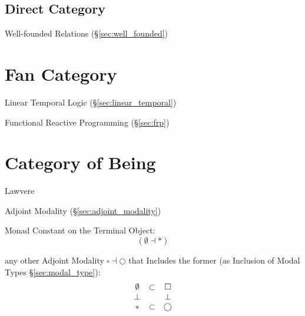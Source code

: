 


\subsection{Direct Category}\label{sec:direct_category}

Well-founded Relations (\S\ref{sec:well_founded})



\section{Fan Category}\label{sec:fan_category}


Linear Temporal Logic (\S\ref{sec:linear_temporal})

Functional Reactive Programming (\S\ref{sec:frp})



\section{Category of Being}\label{sec:category_of_being}

Lawvere

Adjoint Modality (\S\ref{sec:adjoint_modality})

Monad Constant on the Terminal Object:
\[
  (\emptyset \dashv *)
\]

any other Adjoint Modality $\square \dashv \bigcirc$ that Includes the
former (as Inclusion of Modal Types \S\ref{sec:modal_type}):
\[
  \begin{matrix}
    \emptyset & \subset & \square \\
    \bot & \empty & \bot \\
    * & \subset & \bigcirc
  \end{matrix}
\]
